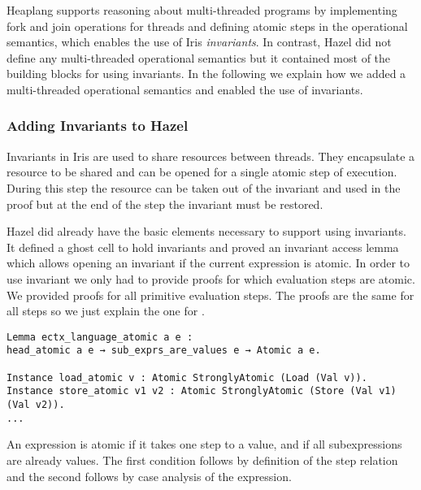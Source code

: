 Heaplang supports reasoning about multi-threaded programs by implementing fork and join operations for threads and defining atomic steps in the operational semantics, which enables the use of Iris \textit{invariants}.
In contrast, Hazel did not define any multi-threaded operational semantics but it contained most of the building blocks for using invariants.
In the following we explain how we added a multi-threaded operational semantics and enabled the use of invariants.


\subsubsection*{Adding Invariants to Hazel}

Invariants in Iris are used to share resources between threads.
They encapsulate a resource to be shared and can be opened for a single atomic step of execution.
During this step the resource can be taken out of the invariant and used in the proof but at the end of the step the invariant must be restored.

Hazel did already have the basic elements necessary to support using invariants.
It defined a ghost cell to hold invariants and proved an invariant access lemma which allows opening an invariant if the current expression is atomic.
In order to use invariant we only had to provide proofs for which evaluation steps are atomic.
We provided proofs for all primitive evaluation steps.
The proofs are the same for all steps so we just explain the one for .

\begin{verbatim}
Lemma ectx_language_atomic a e :
head_atomic a e → sub_exprs_are_values e → Atomic a e.

Instance load_atomic v : Atomic StronglyAtomic (Load (Val v)).
Instance store_atomic v1 v2 : Atomic StronglyAtomic (Store (Val v1) (Val v2)).
...
\end{verbatim}

An expression is atomic if it takes one step to a value, and if all subexpressions are already values.
The first condition follows by definition of the step relation and the second follows by case analysis of the expression.

